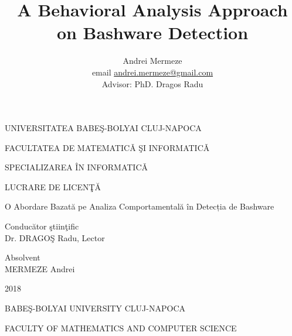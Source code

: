 \documentclass[12pt]{extreport}
\title{A Behavioral Analysis Approach on Bashware Detection}
\author{
        Andrei Mermeze
        \\ email \href{mailto:andrei.mermeze@gmail.com}{andrei.mermeze@gmail.com}
        \\ [1cm]{\normalsize Advisor: PhD. Dragos Radu}
    }
\date{}
\begin{document}

    \pagestyle{empty}
    \begin{titlepage}

        \begin{center}
        {\Large UNIVERSITATEA BABEŞ-BOLYAI CLUJ-NAPOCA}
        \end{center}
    
        \begin{center}
        {\Large FACULTATEA DE MATEMATICǍ ŞI INFORMATICǍ}
        \end{center}
    
        \begin{center}
        {\Large SPECIALIZAREA ÎN INFORMATICǍ}
        \end{center}
    
        \vfill
    
        \begin{center}
        {\LARGE LUCRARE DE LICENŢĂ}
        \end{center}
    
        \begin{center}
        {\Huge O Abordare Bazată pe Analiza Comportamentală în Detecția de Bashware}
        \end{center}
    
        \vfill
    
        \begin{flushleft}
        {\LARGE Conducător ştiinţific  \\ Dr. DRAGOŞ Radu, Lector}
        \end{flushleft}
    
        \begin{flushright}
        {\Large Absolvent \\ MERMEZE Andrei}
        \end{flushright}
    
        \vfill
    
        \begin{center}
        {\LARGE 2018}
        \end{center}

        \pagebreak

        \begin{center}
        {\Large BABEŞ-BOLYAI UNIVERSITY CLUJ-NAPOCA}
        \end{center}

        \begin{center}
        {\Large FACULTY OF MATHEMATICS AND COMPUTER SCIENCE}
        \end{center}


\end{titlepage}
\end{document}
